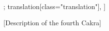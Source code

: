 \documentclass[12pt]{article}%
\begin{document}
\begin{alignment}[
    texts=edition[class="edition"];
    translation[class="translation"],
  ]
\begin{edition}
\begin{prose}
\end{prose}
\end{edition}
\begin{translation}
   \bigskip
    \centerline{\textrm{\small{[Description of the fourth Cakra]}}}
    \bigskip

\end{translation}
\end{alignment}
\end{document}
